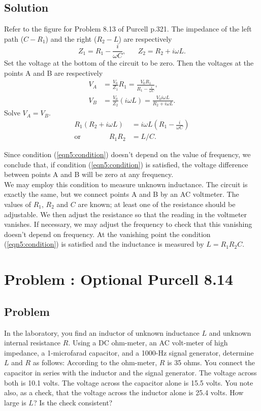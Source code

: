 \documentclass[solutions]{esg8022pset}
\begin{document}
\subsection{Solution}
  Refer to the figure for Problem 8.13 of Purcell p.321.  The impedance
  of the left path ($C-R_1$) and the right ($R_2 - L$) are respectively
  \[Z_1=R_1-\frac{i}{\omega C},\;\;\;\;\;\; Z_2=R_2+i\omega L.\]
  Set the voltage at the bottom of the circuit to be zero.  Then the
  voltages at the points A and B are respectively
  \begin{align}
  V_A & = \frac{V_0}{Z_1} R_1= \frac{V_0 R_1}{R_1-\frac{i}{\omega
  C}},\nonumber\\
  V_B & = \frac{V_0}{Z_2} (i\omega L)=\frac{V_0 i\omega L}{R_2+i\omega L}.
  \end{align}
  Solve $V_A=V_B$.
  \begin{align}
  R_1(R_2+i\omega L) & = i\omega L (R_1-\frac{i}{\omega C})\nonumber\\
  \text{or}\qquad\qquad R_1 R_2 & = L/C.\label{eqn5:condition}
  \end{align}

  Since condition (\ref{eqn5:condition}) doesn't depend on the value of
  frequency, we conclude that, if condition (\ref{eqn5:condition}) is
  satisfied, the voltage difference between points A and B will be zero
  at any frequency.\\

  We may employ this condition to measure unknown inductance.  The
  circuit is exactly the same, but we connect points A and B by an AC
  voltmeter.  The values of $R_1$, $R_2$ and $C$ are known; at least one
  of the resistance should be adjustable.  We then adjust the resistance
  so that the reading in the voltmeter vanishes.  If necessary, we may
  adjust the frequency to check that this vanishing doesn't depend on
  frequency.  At the vanishing point the condition
  (\ref{eqn5:condition}) is satisfied and the inductance is measured by
  $L=R_1 R_2 C$.
\section{Problem \thesection: Optional Purcell 8.14}
\subsection{Problem}
  In the laboratory, you find an inductor of unknown inductance $L$ and
  unknown internal resistance $R$.  Using a DC ohm-meter, an AC volt-meter
  of high impedance, a 1-microfarad capacitor, and a 1000-Hz signal
  generator, determine $L$ and $R$ as follows: According to the ohm-meter,
  $R$ is 35 ohms.  You connect the capacitor in series with the inductor
  and the signal generator.  The voltage across both is 10.1 volts.  The
  voltage across the capacitor alone is 15.5 volts. You note also, as a
  check, that the voltage across the inductor alone is 25.4 volts.  How
  large is $L$?  Is the check consistent?
\end{document}

